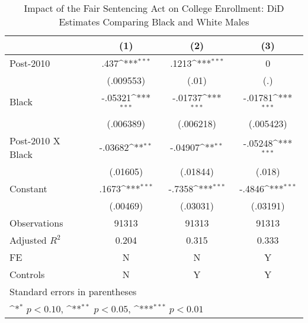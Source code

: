 \begin{table}[htbp]\centering
\def\sym#1{\ifmmode^{#1}\else\(^{#1}\)\fi}
\caption{Impact of the Fair Sentencing Act on College Enrollment: DiD Estimates Comparing Black and White Males}
\begin{tabular}{l*{3}{c}}
\hline\hline
                    &\multicolumn{1}{c}{(1)}         &\multicolumn{1}{c}{(2)}         &\multicolumn{1}{c}{(3)}         \\
\hline
Post-2010           &        .437\sym{***}&       .1213\sym{***}&           0         \\
                    &   (.009553)         &       (.01)         &         (.)         \\
[1em]
Black               &     -.05321\sym{***}&     -.01737\sym{***}&     -.01781\sym{***}\\
                    &   (.006389)         &   (.006218)         &   (.005423)         \\
[1em]
Post-2010 X Black   &     -.03682\sym{**} &     -.04907\sym{**} &     -.05248\sym{***}\\
                    &    (.01605)         &    (.01844)         &      (.018)         \\
[1em]
Constant            &       .1673\sym{***}&      -.7358\sym{***}&      -.4846\sym{***}\\
                    &    (.00469)         &    (.03031)         &    (.03191)         \\
\hline
Observations        &       91313         &       91313         &       91313         \\
Adjusted \(R^{2}\)  &       0.204         &       0.315         &       0.333         \\
FE                  &           N         &           N         &           Y         \\
Controls            &           N         &           Y         &           Y         \\
\hline\hline
\multicolumn{4}{l}{\footnotesize Standard errors in parentheses}\\
\multicolumn{4}{l}{\footnotesize \sym{*} \(p<0.10\), \sym{**} \(p<0.05\), \sym{***} \(p<0.01\)}\\
\end{tabular}
\end{table}
